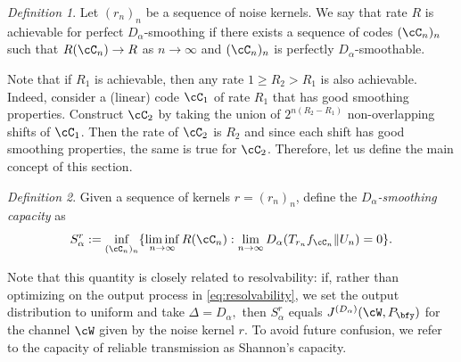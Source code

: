\documentclass{amsart}
\theoremstyle{remark}
\newtheorem{definition}{Definition}[section]
\begin{document}
\begin{definition}
Let $(r_n)_n$ be a sequence of noise kernels. We say that rate $R$ is achievable for perfect 
$D_\alpha$-smoothing if there exists a sequence of codes 
$(\cC_n)_n$ such that $R(\cC_n)\rightarrow R$ as $n \rightarrow \infty$ and $(\cC_n)_n$ is perfectly $D_\alpha$-smoothable.
\end{definition}

Note that if $R_1$ is achievable, then any rate $1\ge R_2 > R_1$ is also achievable. Indeed, consider a (linear) code $\cC_1$ of rate $R_1$ that has good smoothing properties. 
Construct $\cC_2$ by taking the union of $2^{n(R_2-R_1)}$ non-overlapping shifts of $\cC_1$. Then the rate of $\cC_2$ is $R_2$ and since each shift has good smoothing properties, the same is true for $\cC_2$.
Therefore, let us define the main concept of this section.
\begin{definition}\label{def:capacity}
Given a sequence of kernels $r=(r_n)_n$, define the {\em $D_{\alpha}$-smoothing capacity} as
   \begin{equation}\label{eq:smooth-p}
   S_{\alpha}^{r}:=\inf_{(\cC_n)_n}\{\liminf_{n \to \infty }R(\cC_n): \lim_{n\to\infty}D_{\alpha}(T_{r_n}f_{\cC_n}\|U_n) =0\}.
   \end{equation}
\end{definition}
Note that this quantity is closely related to resolvability: if, rather than optimizing on the output process in \eqref{eq:resolvability}, we set the output distribution to uniform and take $\Delta=D_\alpha,$ then $S^r_\alpha$ equals
$J^{(D_\alpha)}(\cW,P_{\bfy})$ for the channel $\cW$ given by the noise kernel $r.$ To avoid future confusion, we refer to the capacity of reliable transmission as Shannon's capacity. 

\end{document}
